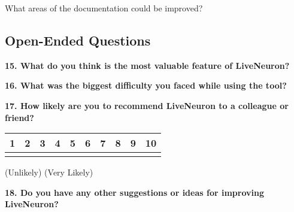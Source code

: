 \documentclass[11pt,a4paper]{article}
\newcommand{\textline}[1]{\underline{\hspace{#1}}}
\newcommand{\tenscale}{
    \begin{center}
    \begin{tabular}{|c|c|c|c|c|c|c|c|c|c|}
    \hline
    \textbf{1} & \textbf{2} & \textbf{3} & \textbf{4} & \textbf{5} & \textbf{6} & \textbf{7} & \textbf{8} & \textbf{9} & \textbf{10} \\
    \hline
    & & & & & & & & & \\
    \hline
    \end{tabular}
    \vspace{0.2cm}
    
    {\small (Unlikely) \hfill (Very Likely)}
    \end{center}
}
\begin{document}
\vspace{0.5cm}

What areas of the documentation could be improved?

\textline{12cm}

\vspace{0.3cm}

\textline{12cm}

\vspace{1cm}

\subsection{Open-Ended Questions}

\textbf{15. What do you think is the most valuable feature of LiveNeuron?}

\vspace{0.5cm}

\textline{12cm}

\vspace{0.3cm}

\textline{12cm}

\vspace{0.3cm}

\textline{12cm}

\vspace{1cm}

\textbf{16. What was the biggest difficulty you faced while using the tool?}

\vspace{0.5cm}

\textline{12cm}

\vspace{0.3cm}

\textline{12cm}

\vspace{0.3cm}

\textline{12cm}

\vspace{1cm}

\textbf{17. How likely are you to recommend LiveNeuron to a colleague or friend?}

\vspace{0.5cm}

\tenscale

\vspace{1cm}

\textbf{18. Do you have any other suggestions or ideas for improving LiveNeuron?}

\vspace{0.5cm}
\end{document}
